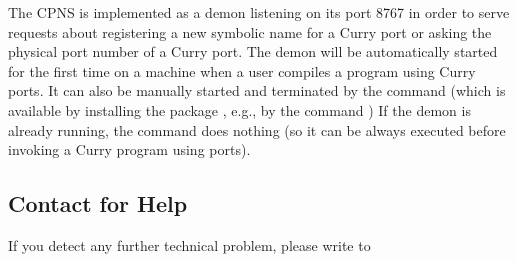 The CPNS is implemented as a demon listening on its port 8767
in order to serve requests about registering a new symbolic
name for a Curry port or asking the physical port number
of a Curry port. The demon will be automatically started for
the first time on a machine when a user compiles a program
using Curry ports.
It can also be manually started and terminated by the
command  (which is available by installing
the package , e.g., by the command )
If the demon is already running,
the command 
does nothing (so it can be always executed
before invoking a Curry program using ports).

\subsection{Contact for Help}

If you detect any further technical problem,
please write to
\begin{center}
\end{center}

